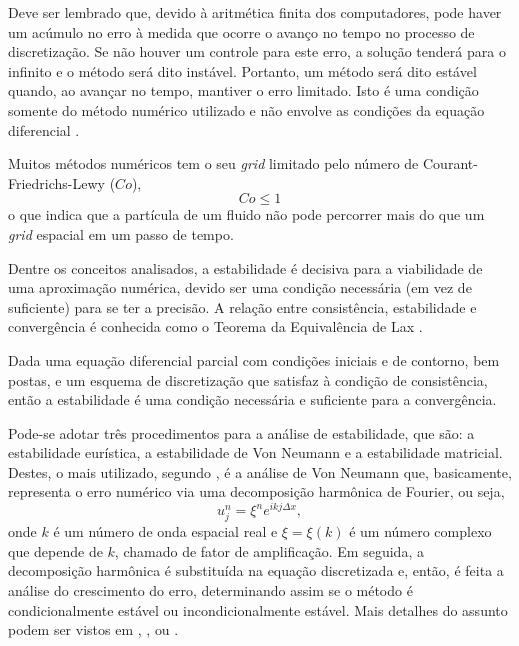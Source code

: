 Deve ser lembrado que, devido à aritmética finita dos computadores, pode haver um acúmulo no erro à medida que ocorre o avanço no tempo no processo de discretização. Se não houver um controle para este erro, a solução tenderá para o infinito e o método será dito instável. Portanto, um método será dito estável quando, ao avançar no tempo, mantiver o erro limitado. Isto é uma condição somente do método numérico utilizado e não envolve as condições da equação diferencial \cite{Hirsch}.

Muitos métodos numéricos tem o seu \textit{grid} limitado pelo número de Courant-Friedrichs-Lewy ($Co$),
\begin{equation} \label{CFL}
Co \leq 1
\end{equation}
o que indica que a partícula de um fluido não pode percorrer mais do que um \textit{grid} espacial em um passo de tempo.

Dentre os conceitos analisados, a estabilidade é decisiva para a viabilidade de uma aproximação numérica, devido ser uma condição necessária (em vez de suficiente) para se ter a precisão. A relação entre consistência, estabilidade e convergência é conhecida como o Teorema da Equivalência de Lax \cite{Hirsch}.
\begin{theorem}
	Dada uma equação diferencial parcial com condições iniciais e de contorno, bem postas, e um esquema de discretização que satisfaz à condição de consistência, então a estabilidade é uma condição necessária e suficiente para a convergência.
\end{theorem}

Pode-se adotar três procedimentos para a análise de estabilidade, que são: a estabilidade eurística, a estabilidade de Von Neumann e a estabilidade matricial. Destes, o mais utilizado, segundo , é a análise de Von Neumann que, basicamente, representa o erro numérico via uma decomposição harmônica de Fourier, ou seja,
\begin{equation} \label{Von_Neumann}
u^{n}_{j} = \xi ^{n} e^{ ikj \Delta x}, 
\end{equation}
onde $k$ é um número de onda espacial real e $ \xi = \xi (k)$ é um número complexo que depende de $k$, chamado de fator de amplificação. Em seguida, a decomposição harmônica é substituída na equação discretizada e, então, é feita a análise do crescimento do erro, determinando assim se o método é condicionalmente estável ou incondicionalmente estável. Mais detalhes do assunto podem ser vistos em \cite{Hirsch}, \cite{Kundu}, \cite{Sperandio} ou \cite{Batchelor}.

